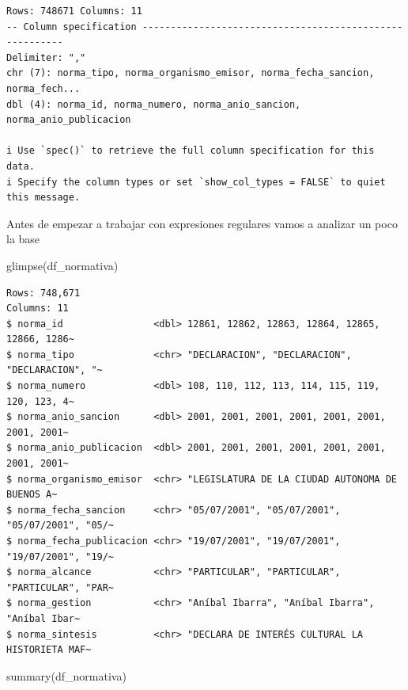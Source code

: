 \documentclass[
  letterpaper,
  DIV=11,
  numbers=noendperiod]{scrreprt}
\newenvironment{Shaded}{\begin{snugshade}}{\end{snugshade}}
\newcommand{\FunctionTok}[1]{\textcolor[rgb]{0.28,0.35,0.67}{#1}}
\newcommand{\NormalTok}[1]{\textcolor[rgb]{0.00,0.23,0.31}{#1}}
\begin{document}
\begin{verbatim}
Rows: 748671 Columns: 11
-- Column specification --------------------------------------------------------
Delimiter: ","
chr (7): norma_tipo, norma_organismo_emisor, norma_fecha_sancion, norma_fech...
dbl (4): norma_id, norma_numero, norma_anio_sancion, norma_anio_publicacion

i Use `spec()` to retrieve the full column specification for this data.
i Specify the column types or set `show_col_types = FALSE` to quiet this message.
\end{verbatim}

Antes de empezar a trabajar con expresiones regulares vamos a analizar
un poco la base

\begin{Shaded}
\begin{Highlighting}[]
\FunctionTok{glimpse}\NormalTok{(df\_normativa)}
\end{Highlighting}
\end{Shaded}

\begin{verbatim}
Rows: 748,671
Columns: 11
$ norma_id                <dbl> 12861, 12862, 12863, 12864, 12865, 12866, 1286~
$ norma_tipo              <chr> "DECLARACION", "DECLARACION", "DECLARACION", "~
$ norma_numero            <dbl> 108, 110, 112, 113, 114, 115, 119, 120, 123, 4~
$ norma_anio_sancion      <dbl> 2001, 2001, 2001, 2001, 2001, 2001, 2001, 2001~
$ norma_anio_publicacion  <dbl> 2001, 2001, 2001, 2001, 2001, 2001, 2001, 2001~
$ norma_organismo_emisor  <chr> "LEGISLATURA DE LA CIUDAD AUTONOMA DE BUENOS A~
$ norma_fecha_sancion     <chr> "05/07/2001", "05/07/2001", "05/07/2001", "05/~
$ norma_fecha_publicacion <chr> "19/07/2001", "19/07/2001", "19/07/2001", "19/~
$ norma_alcance           <chr> "PARTICULAR", "PARTICULAR", "PARTICULAR", "PAR~
$ norma_gestion           <chr> "Aníbal Ibarra", "Aníbal Ibarra", "Aníbal Ibar~
$ norma_sintesis          <chr> "DECLARA DE INTERÉS CULTURAL LA HISTORIETA MAF~
\end{verbatim}

\begin{Shaded}
\begin{Highlighting}[]
\FunctionTok{summary}\NormalTok{(df\_normativa)}
\end{Highlighting}
\end{Shaded}
\end{document}

